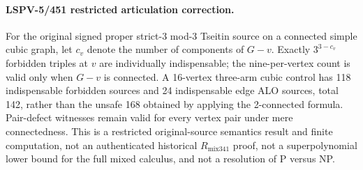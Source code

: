 \paragraph{LSPV-5/451 restricted articulation correction.}
For the original signed proper strict-3 mod-3 Tseitin source on a connected
simple cubic graph, let $c_v$ denote the number of components of $G-v$.
Exactly $3^{3-c_v}$ forbidden triples at $v$ are individually indispensable;
the nine-per-vertex count is valid only when $G-v$ is connected.  A 16-vertex
three-arm cubic control has 118 indispensable forbidden sources and 24
indispensable edge ALO sources, total 142, rather than the unsafe 168 obtained
by applying the 2-connected formula.  Pair-defect witnesses remain valid for
every vertex pair under mere connectedness.  This is a restricted
original-source semantics result and finite computation, not an authenticated
historical $R_{\mathrm{mix341}}$ proof, not a superpolynomial lower bound for
the full mixed calculus, and not a resolution of P versus NP.
